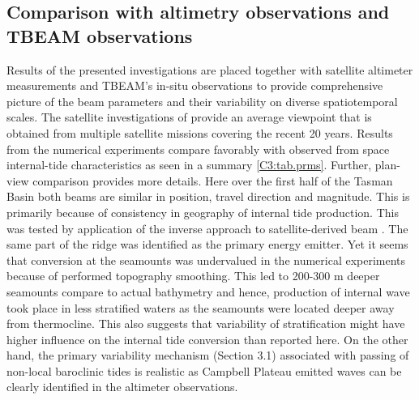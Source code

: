 \documentclass[12pt]{article}
\begin{document}
\subsection{Comparison with altimetry observations and TBEAM observations}
Results of the presented investigations are placed together with satellite altimeter measurements  
\citep{zhao2018satellite} and TBEAM's in-situ observations \citep{waterhouse2018observations} to 
provide comprehensive picture of the beam parameters and their variability on diverse 
spatiotemporal scales. The satellite investigations of \citep{zhao2018satellite} provide an average 
viewpoint that is obtained from multiple satellite missions covering the recent 20 years. Results 
from the numerical experiments compare favorably with observed from space internal-tide 
characteristics as seen in a summary \ref{C3:tab.prms}. Further, plan-view comparison 
 provides more details. Here over the first half of the Tasman Basin 
both beams are similar in position, 
travel direction and magnitude. This is primarily because of consistency in geography of internal 
tide production. This was tested by application of the inverse approach to satellite-derived beam 
. The same part of 
the ridge was identified as the primary energy emitter. Yet it seems that conversion at the 
seamounts was undervalued in the numerical experiments because of performed topography smoothing. 
This led to 200-300 m deeper seamounts compare to actual bathymetry and hence, production of  
internal wave took place in less stratified waters as the seamounts were located deeper away from 
thermocline. This also suggests that variability of stratification might have higher influence on 
the internal tide conversion than reported here. On the other hand, the primary variability 
mechanism (Section 3.1) associated with passing of non-local baroclinic tides is realistic as 
Campbell Plateau emitted waves can be clearly identified in the altimeter observations.\\
\end{document}
